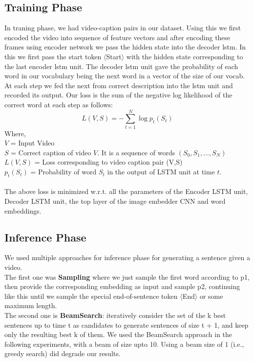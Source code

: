 \documentclass[12pt]{article}
\begin{document}
\subsection{Training Phase}
In traning phase, we had video-caption pairs in our dataset. Using this we first encoded the video into sequence of feature
vectors and after encoding these frames using encoder network we pass the hidden state into the decoder lstm. In this we first
pass the start token $\langle$Start$\rangle$ with the hidden state corresponding to the last encoder lstm unit. The 
decoder lstm unit gave the probability of each word in our vocabulary being the next word in a vector of the size 
of our vocab. At each step we fed the next from correct description into the lstm unit and recorded its output.
Our loss is the sum of the negative log likelihood of the correct word at each step as follows:
$$
	L(V,S) = - \sum_{t=1}^{N}{\log{p_t(S_t)}}
$$
Where,\\
$V$ = Input Video\\
$S$ = Correct caption of video $V$. It is a sequence of words $(S_0,S_1,\ldots,S_N)$\\
$L(V,S)$ = Loss corresponding to video caption pair (V,S)\\
$p_t(S_t)$ = Probability of word $S_t$ in the output of LSTM unit at time $t$.\\\\
The above loss is minimized w.r.t. all the parameters of the Encoder LSTM unit, Decoder LSTM unit,
the top layer of the image embedder CNN and word embeddings.

\subsection{Inference Phase}
We used multiple approaches for inference phase for generating a sentence given a video.
\\The first one was \textbf{Sampling} where we just sample the first word according to p1, then provide the corresponding embedding
as input and sample p2, continuing like this until we sample
the special end-of-sentence token $\langle$End$\rangle$ or some maximum length.
\\The second one is \textbf{BeamSearch}: iteratively consider the set of the k best sentences up to time t as candidates to generate
sentences of size t + 1, and keep only the resulting best k
of them.
We used the BeamSearch approach in the following experiments,
with a beam of size upto 10. Using a beam size of 1 (i.e.,
greedy search) did degrade our results.
\end{document}
